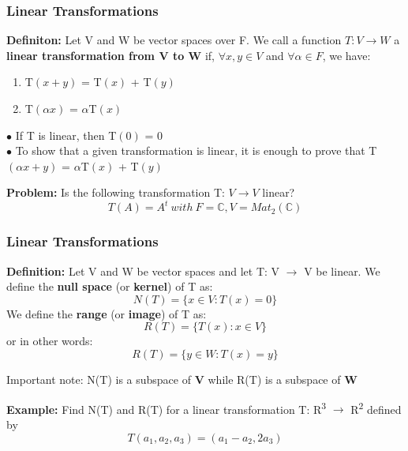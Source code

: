 \documentclass[11pt]{beamer}
\begin{document}
\begin{frame}
	\frametitle{Linear Transformations}
	\textbf{Definiton:} Let V and W be vector spaces over F. We call a function $T: V \rightarrow W $ a \textbf{linear transformation from V to W} if, $\forall x,y \in V$ and $\forall \alpha \in F$, we have:
	\begin{enumerate}
		[default]
		\item T$(x + y)$ = T$(x)$ + T$(y)$
		\item T$(\alpha x)$ = $\alpha$T$(x)$
	\end{enumerate}
\phantom{}


$\bullet$ If T is linear, then T$(0)$ = $0$ \\
$\bullet$ To show that a given transformation is linear, it is enough to prove that T$(\alpha x + y)$ = $\alpha$T$(x)$ + T$(y)$

\phantom{}

\textbf{Problem:} Is the following transformation T: $V \rightarrow V$  linear?
\[  T(A) = A^{t} \ with \ F = \mathbb{C}, V = Mat_{2}(\mathbb{C}) \]
\end{frame}

\begin{frame}
	\frametitle{Linear Transformations}
	\textbf{Definition:} Let V and W be vector spaces and let T: V $\rightarrow$ V be linear. We define the \textbf{null space} (or \textbf{kernel}) of T as:
	\[ N(T) = \{x \in V: T(x) = 0 \}\]
	We define the \textbf{range} (or \textbf{image}) of T as:
	\[ R(T) = \{T(x) : x \in V \}\]
	or in other words:
	\[ R(T) = \{y \in W : T(x) = y \}\]	
	
Important note: N(T) is a subspace of \textbf{V} while R(T) is a subspace of \textbf{W}

\phantom{}

\textbf{Example:} Find N(T) and R(T) for a linear transformation T: R\textsuperscript{3} $\rightarrow$ R\textsuperscript{2} defined by
\[T(a_{1}, a_{2}, a_{3}) = (a_{1} - a_{2}, 2 a_3) \]
\end{frame}
\end{document}

